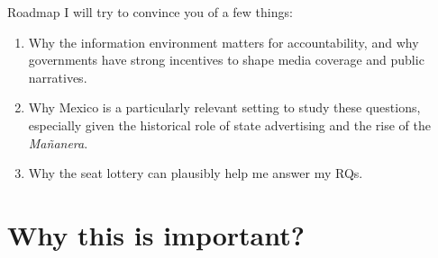 \documentclass[10pt,aspectratio=169]{beamer}
\begin{document}
\begin{frame}{Roadmap}
I will try to convince you of a few things: 
\begin{enumerate}\setlength\itemsep{0.7em}
  \item  Why the information environment matters for accountability, and why governments have strong incentives to shape media coverage and public narratives.
  \pause
  \item Why Mexico is a particularly relevant setting to study these questions, especially given the historical role of state advertising and the rise of the \textit{Mañanera}.
  \pause
    \item Why the seat lottery can plausibly help me answer my RQs.
\end{enumerate}
\end{frame}




\section{Why this is important?}

\end{document}
